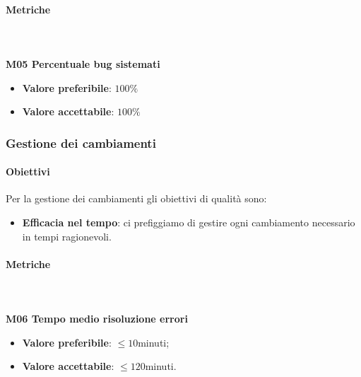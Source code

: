 		\paragraph{Metriche} \mbox{} \\ \\
		\textbf{M05 Percentuale bug sistemati}
		\begin{itemize}
			\item \textbf{Valore preferibile}: $100\%$
			\item \textbf{Valore accettabile}: $100\%$  
		\end{itemize}
			
		\subsubsection{Gestione dei cambiamenti}
		\paragraph{Obiettivi}
		Per la gestione dei cambiamenti gli obiettivi di qualità sono:
		\begin{itemize}
			\item \textbf{Efficacia nel tempo}: ci prefiggiamo di gestire ogni cambiamento necessario in tempi ragionevoli.
		\end{itemize}
		 	\paragraph{Metriche} \mbox{} \\ \\
		 	\textbf{M06 Tempo medio risoluzione errori}
			\begin{itemize}
				\item \textbf{Valore preferibile}: $\le 10$minuti;
				\item \textbf{Valore accettabile}: $\le 120$minuti.
			\end{itemize}

		  
			
				

